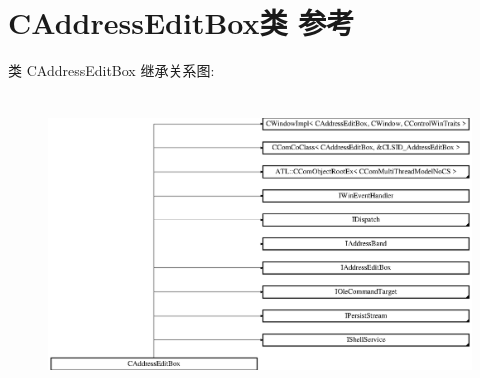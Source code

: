 \hypertarget{class_c_address_edit_box}{}\section{C\+Address\+Edit\+Box类 参考}
\label{class_c_address_edit_box}
类 C\+Address\+Edit\+Box 继承关系图\+:\begin{figure}[H]
\begin{center}
\leavevmode
\includegraphics[height=7.897436cm]{class_c_address_edit_box}
\end{center}
\end{figure}
